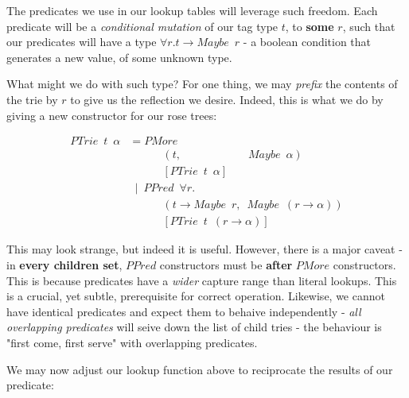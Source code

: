 \documentclass[twoside]{article}
\begin{document}
\begin{multicols}{2}
The predicates we use in our lookup tables will leverage such freedom. Each
predicate will be a \textit{conditional mutation} of our tag type \(t\),
to \textbf{some} \(r\),
such that our predicates will have a type \(\forall r. t \rightarrow Maybe \enspace r\) -
a boolean condition that generates a new value, of some unknown type.

What might we do with such type? For one thing, we may \textit{prefix} the contents
of the trie by \(r\) to give us the reflection we desire. Indeed, this is what we do by giving
a new constructor for our rose trees:

\begin{align*}
PTrie \enspace t \enspace \alpha &= PMore \\
                                 & \quad \quad \quad (t,\quad \quad \quad \quad \quad \quad Maybe \enspace \alpha) \\
                                 & \quad \quad \quad [PTrie \enspace t \enspace \alpha] \\
                                 & \enspace | \enspace PPred \enspace \forall r. \\
                                 & \quad \quad \quad (t \rightarrow Maybe \enspace r, \enspace Maybe \enspace (r \rightarrow \alpha))\\
                                 & \quad \quad \quad [PTrie \enspace t \enspace (r \rightarrow \alpha)]
\end{align*}

This may look strange, but indeed it is useful. However, there is a major caveat -
in \textbf{every children set}, \(PPred\) constructors must be \textbf{after}
\(PMore\) constructors. This is because predicates have a \textit{wider} capture
range than literal lookups. This is a crucial, yet subtle, prerequisite for correct
operation. Likewise, we cannot have identical predicates and expect them to behaive
independently - \textit{all overlapping predicates} will seive down the list of
child tries - the behaviour is "first come, first serve" with overlapping predicates.

We may now adjust our lookup
function above to reciprocate the results of our predicate:


\end{multicols}
\end{document}
